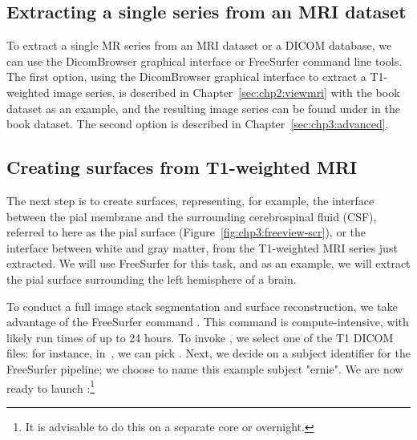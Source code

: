 \subsection{Extracting a single series from an MRI dataset}

To extract a single MR series from an MRI dataset or a DICOM database,
we can use the DicomBrowser graphical interface or FreeSurfer command
line tools. The first option, using the DicomBrowser graphical
interface to extract a T1-weighted image series, is described in
Chapter~\ref{sec:chp2:viewmri} with the book dataset as an example,
and the resulting image series can be found under  in
the book dataset. The second option is described in
Chapter~\ref{sec:chp3:advanced}.

\subsection{Creating surfaces from T1-weighted MRI}
\label{sec:chp3:surfaces}


The next step is to create surfaces, representing, for example, the
interface between the pial membrane and the surrounding cerebrospinal
fluid (CSF), referred to here as the pial surface 
(Figure~\ref{fig:chp3:freeview-scr}), or the interface
between white and gray matter, from the T1-weighted MRI series just
extracted. We will use FreeSurfer for this task, and as an example, we
will extract the pial surface surrounding the left hemisphere of a
brain.

To conduct a full image stack segmentation and surface reconstruction,
we take advantage of the FreeSurfer command . This
command is compute-intensive, with likely run times of up to 24
hours. To invoke , we select one of the T1 DICOM files:
for instance, in~, we can pick . Next, we
decide on a subject identifier for the FreeSurfer pipeline; we choose
to name this example subject "ernie". We are now ready to launch
:\footnote{It is advisable to do this on a separate
  core or overnight.}


